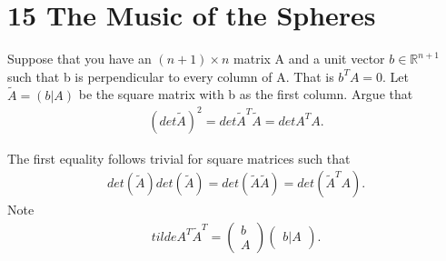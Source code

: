 \section{15 The Music of the Spheres}
\begin{question}
 Suppose that you have an $(n+1) \times  n$  matrix A and a unit vector $b \in  \mathbb{R}^{n+1 }$ such that 
 b is perpendicular to every column of A. That is $b^{T}A = 0 $. Let $\tilde{A} = (b | A)$ be the square matrix
 with b as the first column. Argue that 
 \begin{align*}
   (det \tilde{A})^{2}  = det \tilde{A}^{T} \tilde{A} = det A^{T}A 
 .\end{align*}
\end{question}
\begin{solution}
 The first equality follows trivial for square matrices such that 
 \begin{align*}
   det(\tilde{A})det(\tilde{A}) =  det(\tilde{A}\tilde{A}) = det(\tilde{A}^{T}A  )
 .\end{align*}
 Note 
 \begin{align*}
tilde{A}^{T}\tilde{A}^{T} = \begin{pmatrix} b  \\ A \end{pmatrix}   \begin{pmatrix} b | A \end{pmatrix}
 .\end{align*}
\end{solution}

